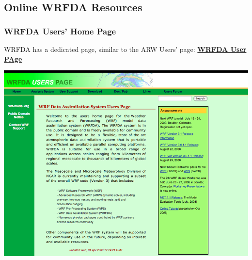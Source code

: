 \documentclass{beamer}
\begin{document}
\subsection{Online WRFDA Resources}
\begin{frame}
\frametitle{WRFDA Users' Home Page}
WRFDA has a dedicated page, similar to the ARW Users’ page: \href{http://www.mmm.ucar.edu/wrf/users/wrfda/}{{\bf WRFDA User PAge}}
\begin{center}
\includegraphics[scale=0.4]{wrfdaHomePage}
\end{center}
\end{frame}
\end{document}

